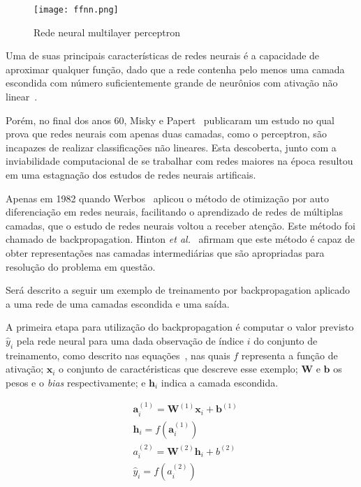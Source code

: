 \begin{figure}
\begin{center} {
    \begin{center}
    \texttt{[image: ffnn.png]}
    \caption{Rede neural multilayer perceptron}
    \label{fig:ff-neural-net}
    \end{center}
}
\end{center}
\end{figure}

Uma de suas principais características de redes neurais é a capacidade de aproximar qualquer função, dado que a rede
contenha pelo menos uma camada escondida com número suficientemente grande de neurônios com ativação não
linear~\cite{hornik89}.

Porém, no final dos anos 60, Misky e Papert~\cite{minsky72} publicaram um estudo no qual prova que redes neurais com
apenas duas camadas, como o perceptron, são incapazes de realizar classificações não lineares.
Esta descoberta, junto com a inviabilidade computacional de se trabalhar com redes maiores na época resultou em uma
estagnação dos estudos de redes neurais artificais.

Apenas em 1982 quando Werbos~\cite{werbos82} aplicou o método de otimização por auto diferenciação em redes neurais,
facilitando o aprendizado de redes de múltiplas camadas, que o estudo de redes neurais voltou a receber atenção.
Este método foi chamado de backpropagation.
Hinton \textit{et al.}~\cite{williams86} afirmam que este método é capaz de obter representações nas camadas
intermediárias que são apropriadas para resolução do problema em questão.

Será descrito a seguir um exemplo de treinamento por backpropagation aplicado a uma rede de uma camadas escondida e uma
saída.

A primeira etapa para utilização do backpropagation é computar o valor previsto ${\hat{y}_i}$ pela rede neural para
uma dada observação de índice $i$ do conjunto de treinamento, como descrito nas
equações~, nas quais $f$ representa a função de ativação; $\mathbf{x}_i$ o
conjunto de caractéristicas que descreve esse exemplo; $\mathbf{W}$ e $\mathbf{b}$ os pesos e o \textit{bias}
respectivamente; e $\mathbf{h}_i$ indica a camada escondida.

\begin{subequations} \label{eq:nn-forward}
\begin{align}
    &\mathbf{a}_i^{(1)} = \mathbf{W}^{(1)} \mathbf{x}_i + \mathbf{b}^{(1)} \label{eq:nn-forward-a1}\\
    &\mathbf{h}_i = f(\mathbf{a}_i^{(1)}) \label{eq:nn-forward-hidden}\\
    &a_i^{(2)} = \mathbf{W}^{(2)} \mathbf{h}_i + b^{(2)} \label{eq:nn-forward-a2}\\
    &\hat{y}_i = f(a_i^{(2)}) \label{eq:nn-forward-y}
\end{align}
\end{subequations}

